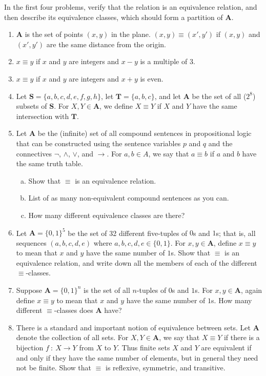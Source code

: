 \documentclass{article}
\newcommand\A{\mathbf A}
\newcommand\Sb{\mathbf S}
\newcommand\T{\mathbf T}
\newcommand{\0}{\mathbf 0}
\newcommand{\1}{\mathbf 1}
\begin{document}
In the first four problems, verify that the relation is an equivalence relation, and then describe its equivalence classes, which should form a partition of $\A$.

\begin{enumerate}
  \item $\A$ is the set of points $(x,y)$ in the plane. $(x,y) \equiv (x',y')$ if $(x,y)$ and $(x',y')$ are the same distance from the origin.
  \item $x \equiv y$ if $x$ and $y$ are integers and $x - y$ is a multiple of $3$.
  \item $x \equiv y$ if $x$ and $y$ are integers and $x + y$ is even.
  \item Let $\Sb = \{a,b,c,d,e,f,g,h\}$, let $\T = \{a,b,c\}$, and let $\A$ be the set of all ($2^8$) subsets of $\Sb$. For $X,Y \in \A$, we define $X \equiv Y$ if $X$ and $Y$ have the same intersection with $\T$.
  \item Let $\A$ be the (infinite) set of all compound sentences in propositional logic that can be constructed using the sentence variables $p$ and $q$ and the connectives $\lnot$, $\land$, $\lor$, and $\to$. For $a,b \in A$, we say that $a \equiv b$ if $a$ and $b$ have the same truth table.
    \begin{enumerate}[(a)]
      \item Show that $\equiv$ is an equivalence relation.
      \item List of as many non-equivalent compound sentences as you can.
      \item How many different equivalence classes are there?
    \end{enumerate}
  \item Let $\A = \{0,1\}^5$ be the set of 32 different five-tuples of $0$s and $1$s; that is, all sequences $(a,b,c,d,e)$ where $a,b,c,d,e \in \{0,1\}$. For $x,y \in \A$, define $x \equiv y$ to mean that $x$ and $y$ have the same number of $1$s. Show that $\equiv$ is an equivalence relation, and write down all the members of each of the different $\equiv$-classes.
  \item Suppose $\A = \{0,1\}^n$ is the set of all $n$-tuples of $0$s and $1$s. For $x,y \in \A$, again define $x \equiv y$ to mean that $x$ and $y$ have the same number of $1$s. How many different $\equiv$-classes does $\A$ have?
  \item There is a standard and important notion of equivalence between sets. Let $\A$ denote the collection of all sets. For $X,Y \in \A$, we say that $X \equiv Y$ if there is a bijection $f\ :\ X \to Y$ from $X$ to $Y$. Thus finite sets $X$ and $Y$ are equivalent if and only if they have the same number of elements, but in general they need not be finite. Show that $\equiv$ is reflexive, symmetric, and transitive.
\end{enumerate}
\end{document}

